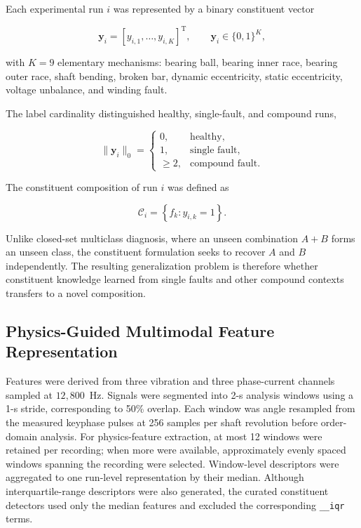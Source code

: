 \documentclass{ieeeaccess}
\begin{document}
Each experimental run $i$ was represented by a binary constituent vector

\begin{equation}
\mathbf{y}_i =
\left[
y_{i,1},
\ldots,
y_{i,K}
\right]^{\mathrm{T}},
\qquad
\mathbf{y}_i \in \{0,1\}^{K},
\label{eq:multilabel_vector}
\end{equation}

with $K=9$ elementary mechanisms: bearing ball, bearing inner race, bearing
outer race, shaft bending, broken bar, dynamic eccentricity, static
eccentricity, voltage unbalance, and winding fault.

The label cardinality distinguished healthy, single-fault, and compound runs,

\begin{equation}
\|\mathbf{y}_i\|_0 =
\begin{cases}
0, & \text{healthy},\\
1, & \text{single fault},\\
\geq 2, & \text{compound fault}.
\end{cases}
\label{eq:compound_definition}
\end{equation}

The constituent composition of run $i$ was defined as

\begin{equation}
\mathcal{C}_i =
\left\{
f_k : y_{i,k}=1
\right\}.
\label{eq:composition_set}
\end{equation}

Unlike closed-set multiclass diagnosis, where an unseen combination $A+B$
forms an unseen class, the constituent formulation seeks to recover $A$ and
$B$ independently. The resulting generalization problem is therefore whether
constituent knowledge learned from single faults and other compound contexts
transfers to a novel composition.


\subsection{Physics-Guided Multimodal Feature Representation}
\label{subsec:physics_features}

Features were derived from three vibration and three phase-current channels
sampled at $12{,}800$~Hz. Signals were segmented into 2-s analysis windows
using a 1-s stride, corresponding to 50\% overlap. Each window was angle
resampled from the measured keyphase pulses at 256 samples per shaft
revolution before order-domain analysis. For physics-feature extraction, at
most 12 windows were retained per recording; when more were available,
approximately evenly spaced windows spanning the recording were selected.
Window-level descriptors were aggregated to one run-level representation by
their median. Although interquartile-range descriptors were
also generated, the curated constituent detectors used only the median
features and excluded the corresponding \texttt{\_\_iqr} terms.
\end{document}
